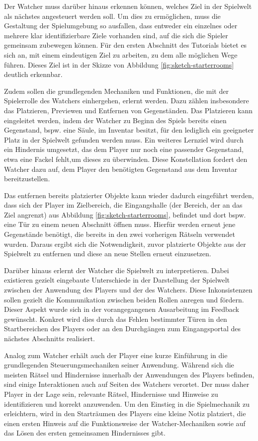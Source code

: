 Der Watcher muss darüber hinaus erkennen können, welches Ziel in der Spielwelt als nächstes angesteuert werden soll. Um dies zu ermöglichen, muss die Gestaltung der Spielumgebung so ausfallen, dass entweder ein einzelnes oder mehrere klar identifizierbare Ziele vorhanden sind, auf die sich die Spieler gemeinsam zubewegen können. Für den ersten Abschnitt des Tutorials bietet es sich an, mit einem eindeutigen Ziel zu arbeiten, zu dem alle möglichen Wege führen. Dieses Ziel ist in der Skizze von Abbildung \ref{fig:sketch-starterrooms} deutlich erkennbar.

Zudem sollen die grundlegenden Mechaniken und Funktionen, die mit der Spielerrolle des Watchers einhergehen, erlernt werden. Dazu zählen insbesondere das Platzieren, Previewen und Entfernen von Gegenständen. Das Platzieren kann eingeleitet werden, indem der Watcher zu Beginn des Spiels bereits einen Gegenstand, bspw. eine Säule, im Inventar besitzt, für den lediglich ein geeigneter Platz in der Spielwelt gefunden werden muss. Ein weiteres Lernziel wird durch ein Hindernis umgesetzt, das dem Player nur noch eine passender Gegenstand, etwa eine Fackel fehlt,um dieses zu überwinden. Diese Konstellation fordert den Watcher dazu auf, dem Player den benötigten Gegenstand aus dem Inventar bereitzustellen.

Das entfernen bereits platzierter Objekte kann wieder dadurch eingeführt werden, dass sich der Player im Zielbereich, die Eingangshalle (der Bereich, der an das Ziel angrenzt) aus Abbildung \ref{fig:sketch-starterrooms}, befindet und dort bspw. eine Tür zu einem neuen Abschnitt öffnen muss. Hierfür werden erneut jene Gegenstände benötigt, die bereits in den zwei vorherigen Rätseln verwendet wurden. Daraus ergibt sich die Notwendigkeit, zuvor platzierte Objekte aus der Spielwelt zu entfernen und diese an neue Stellen erneut einzusetzen.


Darüber hinaus erlernt der Watcher die Spielwelt zu interpretieren. Dabei existieren gezielt eingebaute Unterschiede in der Darstellung der Spielwelt zwischen der Anwendung des Players und der des Watchers. Diese Inkonsistenzen sollen gezielt die Kommunikation zwischen beiden Rollen anregen und fördern. Dieser Aspekt wurde sich in der vorangegangenen Ausarbeitung im Feedback gewünscht. Konkret wird dies durch das Fehlen bestimmter Türen in den Startbereichen des Players oder an den Durchgängen zum Eingangsportal des nächstes Abschnitts realisiert.

Analog zum Watcher erhält auch der Player eine kurze Einführung in die grundlegenden Steuerungsmechaniken seiner Anwendung. Während sich die meisten Rätsel und Hindernisse innerhalb der Anwendungen des Players befinden, sind einige Interaktionen auch auf Seiten des Watchers verortet. Der muss daher Player in der Lage sein, relevante Rätsel, Hindernisse und Hinweise zu identifizieren und korrekt anzuwenden. Um den Einstieg in die Spielmechanik zu erleichtern, wird in den Starträumen des Players eine kleine Notiz platziert, die einen ersten Hinweis auf die Funktionsweise der Watcher-Mechaniken sowie auf das Lösen des ersten gemeinsamen Hindernisses gibt.

